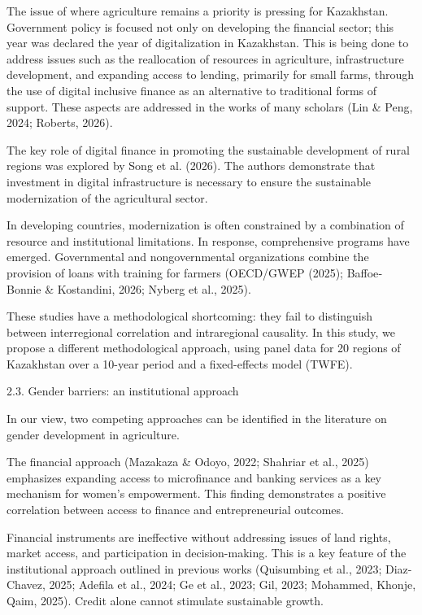 \documentclass[
]{article}
\begin{document}
The issue of where agriculture remains a priority is pressing for
Kazakhstan. Government policy is focused not only on developing the
financial sector; this year was declared the year of digitalization in
Kazakhstan. This is being done to address issues such as the
reallocation of resources in agriculture, infrastructure development,
and expanding access to lending, primarily for small farms, through the
use of digital inclusive finance as an alternative to traditional forms
of support. These aspects are addressed in the works of many scholars
(Lin \& Peng, 2024; Roberts, 2026).

The key role of digital finance in promoting the sustainable development
of rural regions was explored by Song et al. (2026). The authors
demonstrate that investment in digital infrastructure is necessary to
ensure the sustainable modernization of the agricultural sector.

In developing countries, modernization is often constrained by a
combination of resource and institutional limitations. In response,
comprehensive programs have emerged. Governmental and nongovernmental
organizations combine the provision of loans with training for farmers
(OECD/GWEP (2025); Baffoe‐Bonnie \& Kostandini, 2026; Nyberg et al.,
2025).

These studies have a methodological shortcoming: they fail to
distinguish between interregional correlation and intraregional
causality. In this study, we propose a different methodological
approach, using panel data for 20 regions of Kazakhstan over a 10-year
period and a fixed-effects model (TWFE).

2.3. Gender barriers: an institutional approach

In our view, two competing approaches can be identified in the
literature on gender development in agriculture.

The financial approach (Mazakaza \& Odoyo, 2022; Shahriar et al., 2025)
emphasizes expanding access to microfinance and banking services as a
key mechanism for women's empowerment. This finding demonstrates a
positive correlation between access to finance and entrepreneurial
outcomes.

Financial instruments are ineffective without addressing issues of land
rights, market access, and participation in decision-making. This is a
key feature of the institutional approach outlined in previous works
(Quisumbing et al., 2023; Diaz-Chavez, 2025; Adefila et al., 2024; Ge et
al., 2023; Gil, 2023; Mohammed, Khonje, Qaim, 2025). Credit alone cannot
stimulate sustainable growth.
\end{document}
